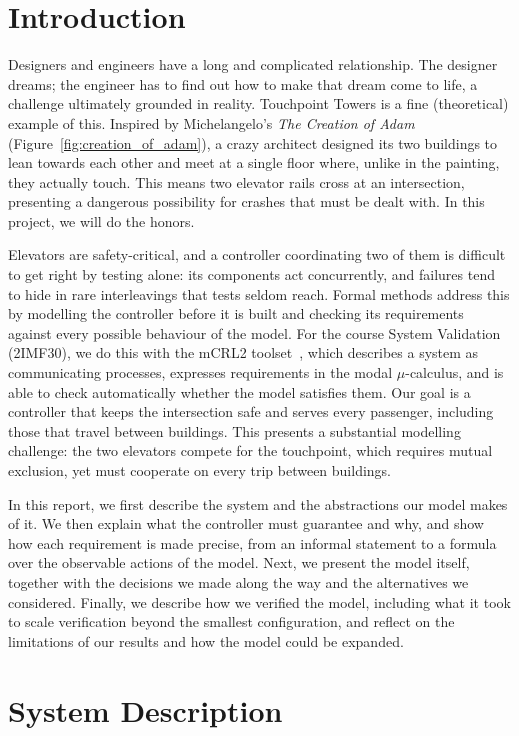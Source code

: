 
\section{Introduction}
\label{sec:introduction}
Designers and engineers have a long and complicated relationship. The designer dreams; the engineer has to find out how to make that dream come to life, a challenge ultimately grounded in reality. Touchpoint Towers is a fine (theoretical) example of this. Inspired by Michelangelo's \textit{The Creation of Adam} (Figure~\ref{fig:creation_of_adam}), a crazy architect designed its two buildings to lean towards each other and meet at a single floor where, unlike in the painting, they actually touch. This means two elevator rails cross at an intersection, presenting a dangerous possibility for crashes that must be dealt with. In this project, we will do the honors. 

Elevators are safety-critical, and a controller coordinating two of them is difficult to get right by testing alone: its components act concurrently, and failures tend to hide in rare interleavings that tests seldom reach. Formal methods address this by modelling the controller before it is built and checking its requirements against every possible behaviour of the model. For the course System Validation (2IMF30), we do this with the mCRL2 toolset~\cite{bunte2019mcrl2,groote2014modeling}, which describes a system as communicating processes, expresses requirements in the modal $\mu$-calculus, and is able to check automatically whether the model satisfies them. Our goal is a controller that keeps the intersection safe and serves every passenger, including those that travel between buildings. This presents a substantial modelling challenge: the two elevators compete for the touchpoint, which requires mutual exclusion, yet must cooperate on every trip between buildings.

In this report, we first describe the system and the abstractions our model makes of it. We then explain what the controller must guarantee and why, and show how each requirement is made precise, from an informal statement to a formula over the observable actions of the model. Next, we present the model itself, together with the decisions we made along the way and the alternatives we considered. Finally, we describe how we verified the model, including what it took to scale verification beyond the smallest configuration, and reflect on the limitations of our results and how the model could be expanded.


\section{System Description}
\label{sec:system-description}

